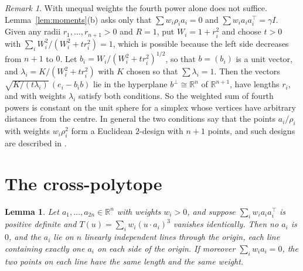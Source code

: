 \documentclass[11pt]{article}
\newtheorem{lemma}[theorem]{Lemma}
\theoremstyle{remark}
\newtheorem{remark}[theorem]{Remark}
\begin{document}
\begin{remark}\label{rem:weights}
With unequal weights the fourth power alone does not suffice. Lemma~\ref{lem:moments}(b) asks only that $\sum w_i\rho_ia_i=0$ and $\sum w_ia_ia_i^{\top}=\gamma I$. Given any radii $r_1,\dots,r_{n+1}>0$ and $R=1$, put $W_i=1+r_i^2$ and choose $t>0$ with $\sum_iW_i^2/(W_i^2+tr_i^2)=1$, which is possible because the left side decreases from $n+1$ to $0$. Let $b_i=W_i/(W_i^2+tr_i^2)^{1/2}$, so that $b=(b_i)$ is a unit vector, and $\lambda_i=K/(W_i^2+tr_i^2)$ with $K$ chosen so that $\sum\lambda_i=1$. Then the vectors $\sqrt{K/(t\lambda_i)}\,(e_i-b_ib)$ lie in the hyperplane $b^{\perp}\cong\mathbb{R}^n$ of $\mathbb{R}^{n+1}$, have lengths $r_i$, and with weights $\lambda_i$ satisfy both conditions. So the weighted sum of fourth powers is constant on the unit sphere for a simplex whose vertices have arbitrary distances from the centre. In general the two conditions say that the points $a_i/\rho_i$ with weights $w_i\rho_i^2$ form a Euclidean $2$-design with $n+1$ points, and such designs are described in \cite[Theorem~5.1]{BBS}.
\end{remark}

\section{The cross-polytope}\label{sec:cross}

\begin{lemma}\label{lem:antipodal}
Let $a_1,\dots,a_{2n}\in\mathbb{R}^n$ with weights $w_i>0$, and suppose $\sum_iw_ia_ia_i^{\top}$ is positive definite and $T(u)=\sum_iw_i(u\cdot a_i)^3$ vanishes identically. Then no $a_i$ is $0$, and the $a_i$ lie on $n$ linearly independent lines through the origin, each line containing exactly one $a_i$ on each side of the origin. If moreover $\sum_iw_ia_i=0$, the two points on each line have the same length and the same weight.
\end{lemma}
\end{document}
